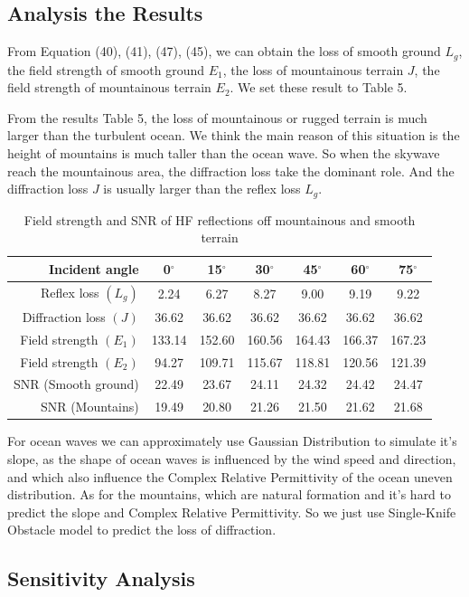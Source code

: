 \documentclass{mcmthesis}
\begin{document}
\subsection{Analysis the Results}
From Equation (40), (41), (47), (45), we can obtain the loss of smooth ground $L_g$, the field strength of smooth ground $E_1$, the loss of mountainous terrain $J$,  the field strength of mountainous terrain $E_2$. We set these result to Table 5.

 From the results Table 5, the loss of mountainous or rugged terrain is much larger than the turbulent ocean. We think the main reason of this situation is the height of mountains is much taller than the ocean wave. So when the skywave reach the mountainous area, the diffraction loss take the dominant role. And the diffraction loss $J$ is usually larger than the reflex loss $L_g$. 
 
\begin{longtable}{r cccccc}
\caption{Field strength and SNR of HF reflections off mountainous and smooth terrain}\\
\toprule
  Incident angle & 0$^\circ$&   15$^\circ$&  30$^\circ$&  45$^\circ$&  60$^\circ$&  75$^\circ$ \\
\midrule 
Reflex loss $(L_g)$& 2.24 & 6.27 & 8.27 & 9.00 & 9.19 & 9.22 \\
Diffraction loss $(J)$ & 36.62 & 36.62 & 36.62 & 36.62 & 36.62 & 36.62 \\

Field strength $(E_1)$& 133.14 & 152.60 & 160.56 & 164.43 & 166.37 & 167.23 \\
Field strength $(E_2)$& 94.27 & 109.71 & 115.67 & 118.81 & 120.56 & 121.39 \\
SNR (Smooth ground)& 22.49 & 23.67 & 24.11 & 24.32 & 24.42 & 24.47 \\

SNR (Mountains) & 19.49 & 20.80 & 21.26 & 21.50 & 21.62 & 21.68 \\
\bottomrule
\end{longtable}

  For ocean waves we can approximately use Gaussian Distribution to simulate it's slope, as the shape of ocean waves is influenced by the wind speed and direction, and which also influence the Complex Relative Permittivity of the ocean uneven distribution. As for the mountains, which are natural formation and it's hard to predict the slope and Complex Relative Permittivity. So we just use Single-Knife Obstacle model to predict the loss of diffraction.
\subsection{Sensitivity Analysis}
\end{document}
